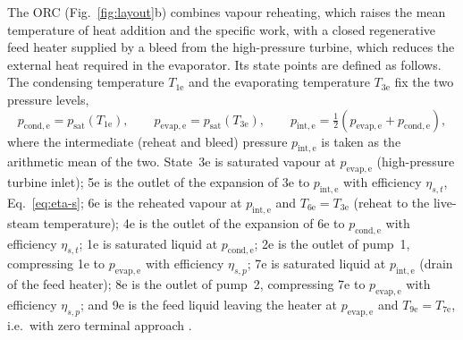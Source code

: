 The ORC (Fig.~\ref{fig:layout}b) combines vapour reheating, which raises the
mean temperature of heat addition and the specific work, with a closed
regenerative feed heater supplied by a bleed from the high-pressure turbine,
which reduces the external heat required in the evaporator. Its state points
are defined as follows. The condensing temperature $T_\mathrm{1e}$ and the
evaporating temperature $T_\mathrm{3e}$ fix the two pressure levels,
\begin{equation}
  p_\mathrm{cond,e}=p_\mathrm{sat}(T_\mathrm{1e}),\qquad
  p_\mathrm{evap,e}=p_\mathrm{sat}(T_\mathrm{3e}),\qquad
  p_\mathrm{int,e}=\tfrac12\left(p_\mathrm{evap,e}+p_\mathrm{cond,e}\right),
  \label{eq:orc-p}
\end{equation}
where the intermediate (reheat and bleed) pressure $p_\mathrm{int,e}$ is taken
as the arithmetic mean of the two. State~3e is saturated vapour at
$p_\mathrm{evap,e}$ (high-pressure turbine inlet); 5e is the outlet of the
expansion of 3e to $p_\mathrm{int,e}$ with efficiency $\eta_{s,t}$,
Eq.~\eqref{eq:eta-s}; 6e is the reheated vapour at $p_\mathrm{int,e}$ and
$T_\mathrm{6e}=T_\mathrm{3e}$ (reheat to the live-steam temperature); 4e is the
outlet of the expansion of 6e to $p_\mathrm{cond,e}$ with efficiency
$\eta_{s,t}$; 1e is saturated liquid at $p_\mathrm{cond,e}$; 2e is the outlet
of pump~1, compressing 1e to $p_\mathrm{evap,e}$ with efficiency
$\eta_{s,p}$; 7e is saturated liquid at $p_\mathrm{int,e}$ (drain of the feed
heater); 8e is the outlet of pump~2, compressing 7e to $p_\mathrm{evap,e}$
with efficiency $\eta_{s,p}$; and 9e is the feed liquid leaving the heater at
$p_\mathrm{evap,e}$ and $T_\mathrm{9e}=T_\mathrm{7e}$, i.e.\ with zero
terminal approach .

